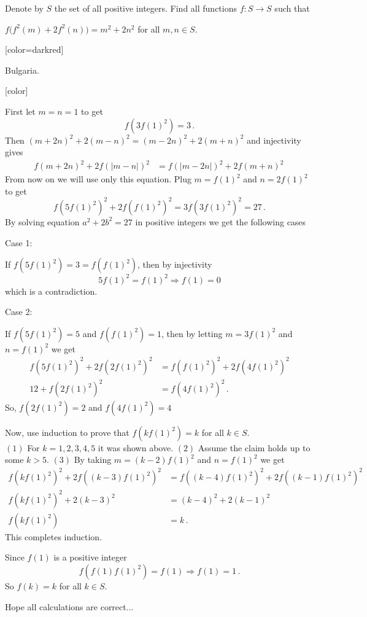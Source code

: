 \begin{solution}
	\begin{tcolorbox}Denote by $ S$ the set of all positive integers. Find all functions $ f: S \rightarrow S$ such that

$ f \bigg(f^2(m) + 2f^2(n)\bigg) = m^2 + 2 n^2$ for all $ m,n \in S$.

[color=darkred]\begin{italicized}Bulgaria.\end{italicized}[\/color]\end{tcolorbox}

First let $ m=n=1$ to get
$$f(3f(1)^2)=3\, .$$
Then $ (m+2n)^2+2(m-n)^2=(m-2n)^2+2(m+n)^2$ and injectivity gives
 \begin{align*}
 f(m+2n)^2+2f(|m-n|)^2&=f(|m-2n|)^2+2f(m+n)^2\,
\end{align*}
From now on we will use only this equation. Plug $ m=f(1)^2$ and $ n=2f(1)^2$ to get 
$$f(5f(1)^2)^2+2f(f(1)^2)^2=3f(3f(1)^2)^2=27\, .$$
By solving equation $ a^2+2b^2=27$  in positive integers we get the following cases

\begin{bolded}Case 1:\end{bolded} If $ f(5f(1)^2)=3=f(f(1)^2) $, then by injectivity 
$$5f(1)^2=f(1)^2\Longrightarrow f(1)=0$$
which is a contradiction.

\begin{bolded}Case 2:\end{bolded}  If $ f(5f(1)^2)=5$ and $ f(f(1)^2)=1$, then by letting  $ m=3f(1)^2$ and $ n=f(1)^2$ we get
\begin{align*}
 f(5f(1)^2)^2+2f(2f(1)^2)^2&=f(f(1)^2)^2+2f(4f(1)^2)^2\\
12 + f(2f(1)^2)^2 &= f(4f(1)^2)^2\, .
\end{align*}
So, $ f(2f(1)^2)=2$ and $ f(4f(1)^2)=4$

Now, use induction to prove that $ f(kf(1)^2)=k$ for all $k \in S$.\\

$ (1)$ For $ k=1,2,3,4,5$ it was shown above.
$ (2)$ Assume the claim holds up to some $k > 5$.
$ (3)$ By taking $ m=(k-2)f(1)^2$ and $ n=f(1)^2$ we get
\begin{align*}
f(kf(1)^2)^2+2f((k-3)f(1)^2)^2&=f((k-4)f(1)^2)^2+2f((k-1)f(1)^2)^2\\
f(kf(1)^2)^2+2(k-3)^2&=(k-4)^2+2(k-1)^2\\
f(kf(1)^2)&=k\, .
\end{align*}
This completes induction.

Since $ f(1)$ is a positive integer
$$ f(f(1)f(1)^2)=f(1) \Longrightarrow f(1)=1\,.$$
So $ f(k)=k$ for all $k\in S$.

Hope all calculations are correct...
\end{solution}



